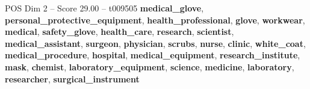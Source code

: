 \begin{textsample}{POS Dim 2 – Score 29.00 – t009505}  \label{ex:f2_pos_022}
\textbf{medical\_glove}, \textbf{personal\_protective\_equipment}, \textbf{health\_professional}, \textbf{glove}, \textbf{workwear}, \textbf{medical}, \textbf{safety\_glove}, \textbf{health\_care}, \textbf{research}, \textbf{scientist}, \textbf{medical\_assistant}, \textbf{surgeon}, \textbf{physician}, \textbf{scrubs}, \textbf{nurse}, \textbf{clinic}, \textbf{white\_coat}, \textbf{medical\_procedure}, \textbf{hospital}, \textbf{medical\_equipment}, \textbf{research\_institute}, \textbf{mask}, \textbf{chemist}, \textbf{laboratory\_equipment}, \textbf{science}, \textbf{medicine}, \textbf{laboratory}, \textbf{researcher}, \textbf{surgical\_instrument}

\end{textsample}

